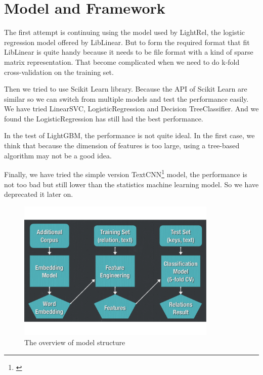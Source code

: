 \section{Model and Framework}
\label{sec:model_and_framework}

The first attempt is continuing using the model used by LightRel, the logistic regression model offered by LibLinear. But to form the required format that fit LibLinear is quite handy because it needs to be file format with a kind of sparse matrix representation. That become complicated when we need to do k-fold cross-validation on the training set.

Then we tried to use Scikit Learn library. Because the API of Scikit Learn are similar so we can switch from multiple models and test the performance easily. We have tried LinearSVC, LogisticRegression and Decision TreeClassifier. And we found the LogisticRegression has still had the best performance.

In the test of LightGBM, the performance is not quite ideal. In the first case, we think that because the dimension of features is too large, using a tree-based algorithm may not be a good idea.

Finally, we have tried the simple version TextCNN\footnote{\cite{bojanowski2017enriching}} model, the performance is not too bad but still lower than the statistics machine learning model. So we have deprecated it later on.

\begin{figure}[ht]
    \begin{center}
    \includegraphics[width=0.85\textwidth]{figures/overall_model.pdf}
    \end{center}
    \caption{The overview of model structure}
    \label{fig:overall_model}
\end{figure}
